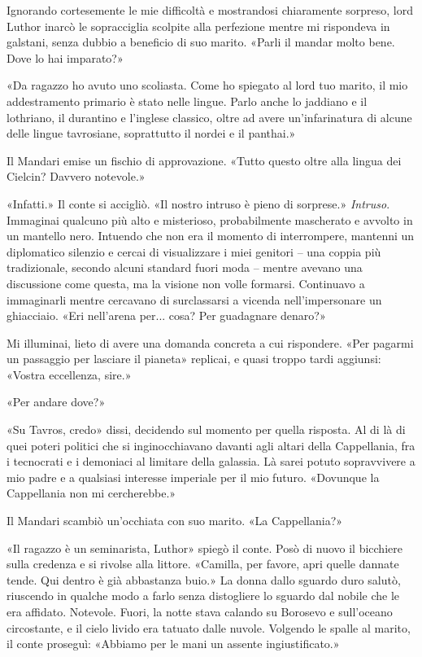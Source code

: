 Ignorando cortesemente le mie difficoltà e mostrandosi chiaramente
sorpreso, lord Luthor inarcò le sopracciglia scolpite alla perfezione
mentre mi rispondeva in galstani, senza dubbio a beneficio di suo
marito. «Parli il mandar molto bene. Dove lo hai imparato?»

«Da ragazzo ho avuto uno scoliasta. Come ho spiegato al lord tuo marito,
il mio addestramento primario è stato nelle lingue. Parlo anche lo
jaddiano e il lothriano, il durantino e l'inglese classico, oltre ad
avere un'infarinatura di alcune delle lingue tavrosiane, soprattutto il
nordei e il panthai.»

Il Mandari emise un fischio di approvazione. «Tutto questo oltre alla
lingua dei Cielcin? Davvero notevole.»

«Infatti.» Il conte si accigliò. «Il nostro intruso è pieno di
sorprese.» \emph{Intruso}. Immaginai qualcuno più alto e misterioso,
probabilmente mascherato e avvolto in un mantello nero. Intuendo che non
era il momento di interrompere, mantenni un diplomatico silenzio e
cercai di visualizzare i miei genitori -- una coppia più tradizionale,
secondo alcuni standard fuori moda -- mentre avevano una discussione
come questa, ma la visione non volle formarsi. Continuavo a immaginarli
mentre cercavano di surclassarsi a vicenda nell'impersonare un
ghiacciaio. «Eri nell'arena per... cosa? Per guadagnare denaro?»

Mi illuminai, lieto di avere una domanda concreta a cui rispondere. «Per
pagarmi un passaggio per lasciare il pianeta» replicai, e quasi troppo
tardi aggiunsi: «Vostra eccellenza, sire.»

«Per andare dove?»

«Su Tavros, credo» dissi, decidendo sul momento per quella risposta. Al
di là di quei poteri politici che si inginocchiavano davanti agli altari
della Cappellania, fra i tecnocrati e i demoniaci al limitare della
galassia. Là sarei potuto sopravvivere a mio padre e a qualsiasi
interesse imperiale per il mio futuro. «Dovunque la Cappellania non mi
cercherebbe.»

Il Mandari scambiò un'occhiata con suo marito. «La Cappellania?»

«Il ragazzo è un seminarista, Luthor» spiegò il conte. Posò di nuovo il
bicchiere sulla credenza e si rivolse alla littore. «Camilla, per
favore, apri quelle dannate tende. Qui dentro è già abbastanza buio.» La
donna dallo sguardo duro salutò, riuscendo in qualche modo a farlo senza
distogliere lo sguardo dal nobile che le era affidato. Notevole. Fuori,
la notte stava calando su Borosevo e sull'oceano circostante, e il cielo
livido era tatuato dalle nuvole. Volgendo le spalle al marito, il conte
proseguì: «Abbiamo per le mani un assente ingiustificato.»

